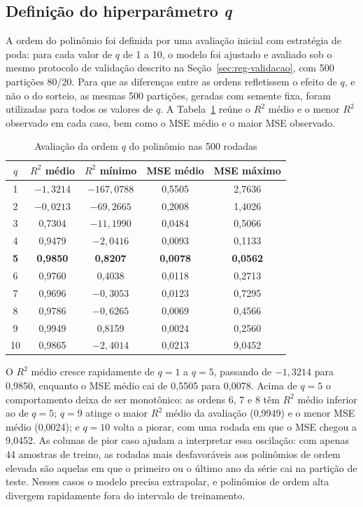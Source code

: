 \documentclass[conference]{IEEEtran}
\begin{document}
\subsection{Definição do hiperparâmetro \textit{q}}

A ordem do polinômio foi definida por uma avaliação inicial com estratégia de
poda: para cada valor de $q$ de 1 a 10, o modelo foi ajustado e avaliado sob o
mesmo protocolo de validação descrito na Seção~\ref{sec:reg-validacao}, com 500
partições 80/20. Para que as diferenças entre as ordens refletissem o efeito de
$q$, e não o do sorteio, as mesmas 500 partições, geradas com semente fixa,
foram utilizadas para todos os valores de $q$. A Tabela~\ref{tab:q} reúne o
$R^2$ médio e o menor $R^2$ observado em cada caso, bem como o MSE médio e o
maior MSE observado.

\begin{table}[htbp]
\caption{Avaliação da ordem $q$ do polinômio nas 500 rodadas}
\begin{center}
\begin{tabular}{|c|c|c|c|c|}
\hline
\textbf{$q$} & \textbf{$R^2$ médio} & \textbf{$R^2$ mínimo} & \textbf{MSE médio} & \textbf{MSE máximo} \\
\hline
1  & $-1{,}3214$ & $-167{,}0788$ & 0,5505 & 2,7636 \\
\hline
2  & $-0{,}0213$ & $-69{,}2665$ & 0,2008 & 1,4026 \\
\hline
3  & 0,7304 & $-11{,}1990$ & 0,0484 & 0,5066 \\
\hline
4  & 0,9479 & $-2{,}0416$ & 0,0093 & 0,1133 \\
\hline
\textbf{5}  & \textbf{0,9850} & \textbf{0,8207} & \textbf{0,0078} & \textbf{0,0562} \\
\hline
6  & 0,9760 & 0,4038 & 0,0118 & 0,2713 \\
\hline
7  & 0,9696 & $-0{,}3053$ & 0,0123 & 0,7295 \\
\hline
8  & 0,9786 & $-0{,}6265$ & 0,0069 & 0,4566 \\
\hline
9  & 0,9949 & 0,8159 & 0,0024 & 0,2560 \\
\hline
10 & 0,9865 & $-2{,}4014$ & 0,0213 & 9,0452 \\
\hline
\end{tabular}
\label{tab:q}
\end{center}
\end{table}

O $R^2$ médio cresce rapidamente de $q = 1$ a $q = 5$, passando de
$-1{,}3214$ para 0,9850, enquanto o MSE médio cai de 0,5505 para 0,0078. Acima
de $q = 5$ o comportamento deixa de ser monotônico: as ordens 6, 7 e 8 têm
$R^2$ médio inferior ao de $q = 5$; $q = 9$ atinge o maior $R^2$ médio da
avaliação (0,9949) e o menor MSE médio (0,0024); e $q = 10$ volta a piorar,
com uma rodada em que o MSE chegou a 9,0452. As colunas de pior caso ajudam a
interpretar essa oscilação: com apenas 44 amostras de treino, as rodadas mais
desfavoráveis aos polinômios de ordem elevada são aquelas em que o primeiro ou
o último ano da série cai na partição de teste. Nesses casos o modelo precisa
extrapolar, e polinômios de ordem alta divergem rapidamente fora do intervalo
de treinamento.
\end{document}
